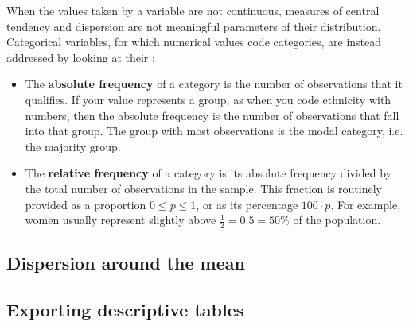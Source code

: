   When the values taken by a variable are not continuous, measures of central tendency and dispersion are not meaningful parameters of their distribution. Categorical variables, for which numerical values code categories, are instead addressed by looking at their :%

  \begin{itemize}
  	\item The \textbf{absolute frequency} of a category is the number of observations that it qualifies. If your value represents a group, as when you code ethnicity with numbers, then the absolute frequency is the number of observations that fall into that group. The group with most observations is the modal category, i.e. the majority group.%

  	\item The \textbf{relative frequency} of a category is its absolute frequency divided by the total number of observations in the sample. This fraction is routinely provided as a proportion $0 \leq p \leq 1$, or as its percentage $100 \cdot p$. For example, women usually represent slightly above $\frac{1}{2}=0.5=50\%$ of the population.%
  \end{itemize}

	\subsection{Dispersion around the mean}%


	\subsection{Exporting descriptive tables}

